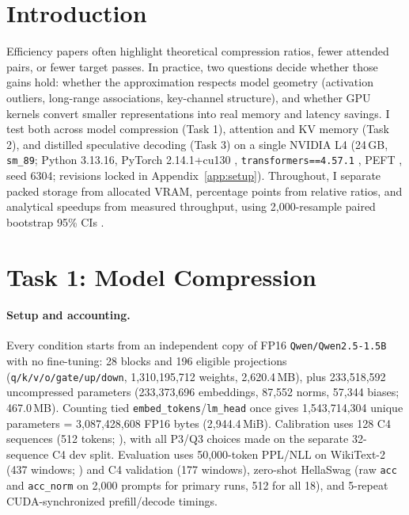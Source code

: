 \documentclass{article}
\begin{document}
\section{Introduction}
Efficiency papers often highlight theoretical compression ratios, fewer attended pairs, or fewer target passes. In practice, two questions decide whether those gains hold: whether the approximation respects model geometry (activation outliers, long-range associations, key-channel structure), and whether GPU kernels convert smaller representations into real memory and latency savings. I test both across model compression (Task 1), attention and KV memory (Task 2), and distilled speculative decoding (Task 3) on a single NVIDIA L4 (24\,GB, \texttt{sm\_89}; Python 3.13.16, PyTorch 2.14.1+cu130 \citep{paszke2019pytorch}, \texttt{transformers==4.57.1} \citep{wolf2020transformers}, PEFT \citep{mangrulkar2022peft}, seed 6304; revisions locked in Appendix~\ref{app:setup}). Throughout, I separate packed storage from allocated VRAM, percentage points from relative ratios, and analytical speedups from measured throughput, using 2,000-resample paired bootstrap 95\% CIs \citep{efron1993bootstrap}.

\section{Task 1: Model Compression}

\paragraph{Setup and accounting.}
Every condition starts from an independent copy of FP16 \texttt{Qwen/Qwen2.5-1.5B} \citep{qwen2025qwen25} with no fine-tuning: 28 blocks and 196 eligible projections (\texttt{q/k/v/o/gate/up/down}, 1,310,195,712 weights, 2,620.4\,MB), plus 233,518,592 uncompressed parameters (233,373,696 embeddings, 87,552 norms, 57,344 biases; 467.0\,MB). Counting tied \texttt{embed\_tokens}/\texttt{lm\_head} once gives 1,543,714,304 unique parameters = 3,087,428,608 FP16 bytes (2,944.4\,MiB). Calibration uses 128 C4 sequences (512 tokens; \citealp{raffel2020c4}), with all P3/Q3 choices made on the separate 32-sequence C4 dev split. Evaluation uses 50,000-token PPL/NLL on WikiText-2 (437 windows; \citealp{merity2017wikitext}) and C4 validation (177 windows), zero-shot HellaSwag \citep{zellers2019hellaswag} (raw \texttt{acc} and \texttt{acc\_norm} on 2,000 prompts for primary runs, 512 for all 18), and 5-repeat CUDA-synchronized prefill/decode timings.
\end{document}

